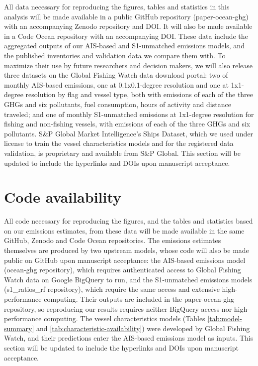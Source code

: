 \documentclass[lineno,pdflatex,sn-nature]{sn-jnl}
\begin{document}
All data necessary for reproducing the figures, tables and statistics in this analysis will be made available in a public GitHub repository (paper-ocean-ghg) with an accompanying Zenodo repository and DOI. It will also be made available in a Code Ocean repository with an accompanying DOI. These data include the aggregated outputs of our AIS-based and S1-unmatched emissions models, and the published inventories and validation data we compare them with. To maximize their use by future researchers and decision makers, we will also release three datasets on the Global Fishing Watch data download portal: two of monthly AIS-based emissions, one at 0.1x0.1-degree resolution and one at 1x1-degree resolution by flag and vessel type, both with emissions of each of the three GHGs and six pollutants, fuel consumption, hours of activity and distance traveled; and one of monthly S1-unmatched emissions at 1x1-degree resolution for fishing and non-fishing vessels, with emissions of each of the three GHGs and six pollutants. S\&P Global Market Intelligence's Ships Dataset, which we used under license to train the vessel characteristics models and for the registered data validation, is proprietary and available from S\&P Global. This section will be updated to include the hyperlinks and DOIs upon manuscript acceptance.

\section*{Code availability}

All code necessary for reproducing the figures, and the tables and statistics based on our emissions estimates, from these data will be made available in the same GitHub, Zenodo and Code Ocean repositories. The emissions estimates themselves are produced by two upstream models, whose code will also be made public on GitHub upon manuscript acceptance: the AIS-based emissions model (ocean-ghg repository), which requires authenticated access to Global Fishing Watch data on Google BigQuery to run, and the S1-unmatched emissions models (s1\_ratios\_rf repository), which require the same access and extensive high-performance computing. Their outputs are included in the paper-ocean-ghg repository, so reproducing our results requires neither BigQuery access nor high-performance computing. The vessel characteristics models (Tables \ref{tab:model-summary} and \ref{tab:characteristic-availability}) were developed by Global Fishing Watch, and their predictions enter the AIS-based emissions model as inputs. This section will be updated to include the hyperlinks and DOIs upon manuscript acceptance.
\end{document}
